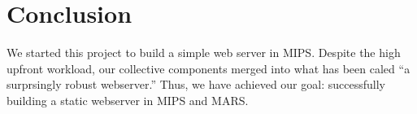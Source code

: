 \documentclass[journal,10pt]{IEEEtran}
\begin{document}
%






\section{Conclusion}
We started this project to build a simple web server in MIPS. Despite the high
upfront workload, our collective components merged into what has been caled ``a
surprsingly robust webserver.'' Thus, we have achieved our goal: successfully
building a static webserver in MIPS and MARS.


\appendices

\end{document}
